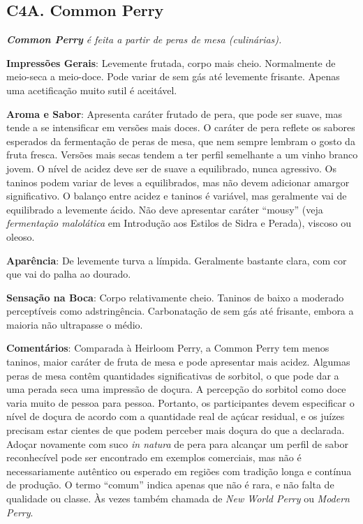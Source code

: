 \subsection*{C4A. Common Perry}

\textit{\textbf{Common Perry} é feita a partir de peras de mesa (culinárias).}

\textbf{Impressões Gerais}: Levemente frutada, corpo mais cheio. Normalmente de meio-seca a meio-doce. Pode variar de sem gás até levemente frisante. Apenas uma acetificação muito sutil é aceitável.

\textbf{Aroma e Sabor}: Apresenta caráter frutado de pera, que pode ser suave, mas tende a se intensificar em versões mais doces. O caráter de pera reflete os sabores esperados da fermentação de peras de mesa, que nem sempre lembram o gosto da fruta fresca. Versões mais secas tendem a ter perfil semelhante a um vinho branco jovem. O nível de acidez deve ser de suave a equilibrado, nunca agressivo. Os taninos podem variar de leves a equilibrados, mas não devem adicionar amargor significativo. O balanço entre acidez e taninos é variável, mas geralmente vai de equilibrado a levemente ácido. Não deve apresentar caráter “mousy” (veja \textit{fermentação malolática} em Introdução aos Estilos de Sidra e Perada), viscoso ou oleoso.

\textbf{Aparência}: De levemente turva a límpida. Geralmente bastante clara, com cor que vai do palha ao dourado.

\textbf{Sensação na Boca}: Corpo relativamente cheio. Taninos de baixo a moderado perceptíveis como adstringência. Carbonatação de sem gás até frisante, embora a maioria não ultrapasse o médio.

\textbf{Comentários}: Comparada à Heirloom Perry, a Common Perry tem menos taninos, maior caráter de fruta de mesa e pode apresentar mais acidez. Algumas peras de mesa contêm quantidades significativas de sorbitol, o que pode dar a uma perada seca uma impressão de doçura. A percepção do sorbitol como doce varia muito de pessoa para pessoa. Portanto, os participantes devem especificar o nível de doçura de acordo com a quantidade real de açúcar residual, e os juízes precisam estar cientes de que podem perceber mais doçura do que a declarada. Adoçar novamente com suco \textit{in natura} de pera para alcançar um perfil de sabor reconhecível pode ser encontrado em exemplos comerciais, mas não é necessariamente autêntico ou esperado em regiões com tradição longa e contínua de produção. O termo “comum” indica apenas que não é rara, e não falta de qualidade ou classe. Às vezes também chamada de \textit{New World Perry} ou \textit{Modern Perry}.

